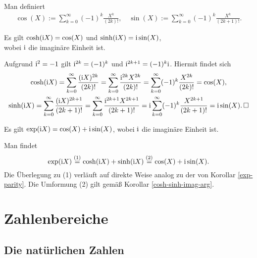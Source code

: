 \newpage
\begin{Definition} Man definiert
\begin{gather*}
\cos(X) := \sum_{k=0}^\infty (-1)^k\frac{X^k}{(2k)!},\quad
\sin(X) := \sum_{k=0}^\infty (-1)^k\frac{X^k}{(2k+1)!}.
\end{gather*}
\end{Definition}

\begin{Korollar}\label{cosh-sinh-imag-arg}
Es gilt $\cosh(\mathrm i X) = \cos(X)$ und $\sinh(\mathrm i X) = \mathrm i\sin(X)$,\\
wobei $\mathrm i$ die imaginäre Einheit ist.
\end{Korollar}
\begin{Beweis}
Aufgrund $\mathrm i^2=-1$ gilt $\mathrm i^{2k} = (-1)^k$ und $\mathrm i^{2k+1} = (-1)^k\mathrm i$.
Hiermit findet sich
\begin{gather*}
\cosh(\mathrm i X) = \sum_{k=0}^\infty\frac{(\mathrm i X)^{2k}}{(2k)!}
= \sum_{k=0}^\infty\frac{\mathrm i^{2k} X^{2k}}{(2k)!}
= \sum_{k=0}^\infty (-1)^k\frac{X^{2k}}{(2k)!} = \cos(X),\\
\sinh(\mathrm i X) = \sum_{k=0}^\infty\frac{(\mathrm i X)^{2k+1}}{(2k+1)!}
= \sum_{k=0}^\infty\frac{\mathrm i^{2k+1} X^{2k+1}}{(2k+1)!}
= \mathrm i\sum_{k=0}^\infty (-1)^k\frac{X^{2k+1}}{(2k+1)!}
= \mathrm i\sin(X).\,\square
\end{gather*}
\end{Beweis}

\begin{Korollar}\newlinefirst
Es gilt $\exp(\mathrm i X) = \cos(X)+\mathrm i\sin(X)$, wobei $\mathrm i$ die
imaginäre Einheit ist.
\end{Korollar}
\begin{Beweis}
Man findet
\[\exp(\mathrm i X) \stackrel{\text{(1)}}= \cosh(\mathrm i X) + \sinh(\mathrm i X)
\stackrel{\text{(2)}}= \cos(X)+\mathrm i\sin(X).\]
Die Überlegung zu (1) verläuft auf direkte Weise analog zu der von
Korollar \ref{exp-parity}. Die Umformung (2) gilt gemäß Korollar
\ref{cosh-sinh-imag-arg}.\,\qedsymbol
\end{Beweis}

\section{Zahlenbereiche}

\subsection{Die natürlichen Zahlen}


